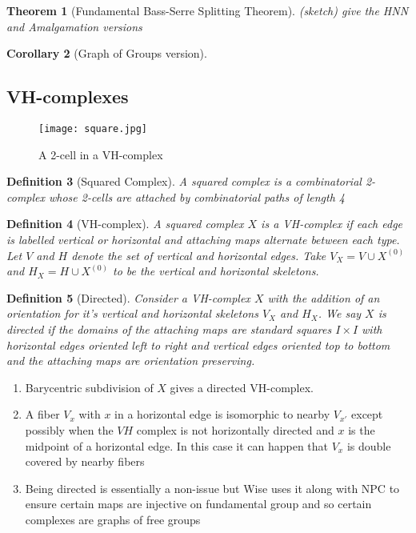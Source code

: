 \documentclass{article}
\theoremstyle{mystyle}
\newtheorem{thm}{Theorem}[section]
\newtheorem{defn}[thm]{Definition}
\newtheorem{cor}[thm]{Corollary}
\theoremstyle{remark}
\begin{document}
\begin{thm}
[Fundamental Bass-Serre Splitting Theorem]
(sketch) give the HNN and Amalgamation versions
\end{thm}

\begin{cor}
[Graph of Groups version]
\end{cor}


\subsection{VH-complexes}

\begin{figure}[htp]
    \centering
    \texttt{[image: square.jpg]}
    \caption{A 2-cell in a VH-complex}
    \label{fig:square}
\end{figure}
 
\begin{defn}
    [Squared Complex]
    A \emph{squared complex} is a combinatorial 2-complex whose 2-cells are attached by combinatorial paths of length 4
\end{defn}
\begin{defn}
    [VH-complex]
    A squared complex $X$ is a \emph{VH-complex} if each edge is labelled vertical or horizontal and attaching maps alternate between each type. Let $V$ and $H$ denote the set of vertical and horizontal edges. Take $V_X = V \cup X^{(0)}$ and $H_X = H \cup X^{(0)}$ to be the vertical and horizontal skeletons.
\end{defn}
\begin{defn}
    [Directed]
    Consider a VH-complex $X$ with the addition of an orientation for it's vertical and horizontal skeletons $V_X$ and $H_X$. We say $X$ is \emph{directed} if the domains of the attaching maps are standard squares $I \times I$ with horizontal edges oriented left to right and vertical edges oriented top to bottom and the attaching maps are orientation preserving.
\end{defn}
\begin{enumerate}
    \item Barycentric subdivision of $X$ gives a directed VH-complex.
    \item A fiber $V_x$ with $x$ in a horizontal edge is isomorphic to nearby $V_{x'}$ except possibly when the $VH$ complex is not horizontally directed and $x$ is the midpoint of a horizontal edge. In this case it can happen that $V_x$ is double covered by nearby fibers
    \item Being directed is essentially a non-issue but Wise uses it along with NPC to ensure certain maps are injective on fundamental group and so certain complexes are graphs of free groups
\end{enumerate}
\end{document}
